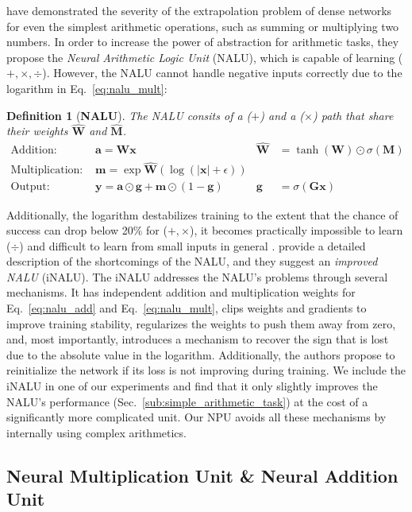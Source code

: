 \documentclass[9pt]{article}
\newtheorem*{definition}{Definition}
\begin{document}
\citet{trask_neural_2018} have demonstrated the severity of the extrapolation
problem of dense networks for even the simplest arithmetic operations, such as
summing or multiplying two numbers.  In order to increase the power of
abstraction for arithmetic tasks, they propose the \emph{Neural Arithmetic
Logic Unit} (NALU), which is capable of learning ($+,\times,\div$).  However,
the NALU cannot handle negative inputs correctly due to the logarithm in
Eq.~\ref{eq:nalu_mult}:
\begin{definition}[{\bf NALU}]
  The NALU consits of a ($+$) and a ($\times$) path that share their weights $\bm{\hat{W}}$ and $\bm{\hat{M}}$.
\begin{align}
  \label{eq:nalu_add}
  \text{Addition: }       & \bm a = \bm W \bm x
                          & \bm{\hat W}& = \tanh(\bm{W}) \odot \sigma(\bm{M}) \\
  \label{eq:nalu_mult}
  \text{Multiplication: } & \bm m = \exp \bm{\hat W}(\log(|\bm x|+\epsilon)) & &\\
  \text{Output: }         & \bm y = \bm a \odot \bm g + \bm m \odot (1-\bm g) 
                          & \bm g& = \sigma(\bm G\bm x)
\end{align}
\end{definition}
Additionally, the logarithm destabilizes training to the extent that the chance of success
can drop below 20\% for ($+,\times$), it becomes practically impossible to
learn ($\div$) and difficult to learn from small inputs in general
\citep{madsen_measuring_2019}.
\cite{schlor_inalu_2020} provide a detailed description of the shortcomings of
the NALU, and they suggest an \emph{improved NALU} (iNALU).  The iNALU addresses
the NALU's problems through several mechanisms.  It has independent
addition and multiplication weights for Eq.~\ref{eq:nalu_add} and
Eq.~\ref{eq:nalu_mult}, clips weights and gradients to improve training
stability, regularizes the weights to push them away from zero, and, most
importantly, introduces a mechanism to recover the sign that is lost due to the
absolute value in the logarithm. Additionally, the authors propose to
reinitialize the network if its loss is not improving during training.  We
include the iNALU in one of our experiments and find that it only slightly
improves the NALU's performance (Sec.~\ref{sub:simple_arithmetic_task}) at the
cost of a significantly more complicated unit. Our NPU avoids all these mechanisms
by internally using complex arithmetics.

\subsection{Neural Multiplication Unit \& Neural Addition Unit}%
\label{sub:neural_multiplication_unit}
\end{document}
